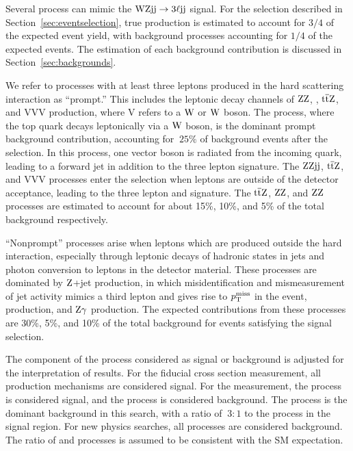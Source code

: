 Several process can mimic the $\rm {WZjj}\rightarrow3\ell\mathrm{j}\mathrm{j}$ signal. 
For the \EWWZ
selection described in Section~\ref{sec:eventselection},
true \WZjj production is estimated to account for $3/4$ of the
expected event yield, with background processes accounting
for $1/4$ of the expected events. The estimation of each
background contribution is discussed in Section~\ref{sec:backgrounds}.

We refer to processes 
with at least three leptons produced in the hard scattering interaction
as ``prompt.'' This includes the leptonic decay channels of 
$\mathrm{Z}\mathrm{Z}$, \tZq, ${\mathrm{t}\overline{\mathrm{t}}}\mathrm{Z}$, and VVV production,
where V refers to a $\mathrm{W}$ or $\mathrm{W}$ boson. The \tZq process, where
the top quark decays leptonically via a $\mathrm{W}$ boson, is the dominant
prompt background contribution, accounting for
$~25\%$ of background events after the \EWWZ selection. 
In this process, 
one vector boson is radiated from the incoming quark,
leading to a forward jet in addition to the three lepton signature.
The $\mathrm{Z}\mathrm{Z}\mathrm{j}\mathrm{j}$, ${\mathrm{t}\overline{\mathrm{t}}}\mathrm{Z}$, and VVV processes
enter the \WZjj selection when leptons
are outside of the detector acceptance, leading to the three lepton and
\ptmiss signature. The ${\mathrm{t}\overline{\mathrm{t}}}\mathrm{Z}$, $\mathrm{Z}\mathrm{Z}$, and $\mathrm{Z}\mathrm{Z}$ processes
are estimated to account for about 15\%, 10\%, and 5\% of the total
background respectively.

``Nonprompt'' processes arise when leptons which are produced outside
the hard interaction, especially through leptonic decays of hadronic
states in jets and photon conversion to leptons in the detector material.
These processes are dominated by $\mathrm{Z}$+jet production, in which
misidentification and mismeasurement of jet activity mimics
a third lepton and gives rise to $p_{\mathrm{T}}^\text{miss}$ in the event, \ttbar production,
and $\mathrm{Z}\gamma$ production. The expected contributions from these 
processes are 30\%, 5\%, and 10\% of the total background for events
satisfying the \EWWZ signal selection.

The component of the \WZjj process considered as signal or background
is adjusted for the interpretation of results. For the \WZjj fiducial
cross section measurement, all \WZjj production mechanisms are considered 
signal.
For the \EWWZ measurement,
the \EWWZ process is considered signal, and the \QCDWZ process is considered
background. The \QCDWZ process is the dominant background in this search,
with a ratio of $~3:1$ to the \EWWZ process in the signal region.
For new physics searches, all \WZjj processes are considered background.
The ratio of \EWWZ and \QCDWZ processes is assumed to be consistent with the SM
expectation.

